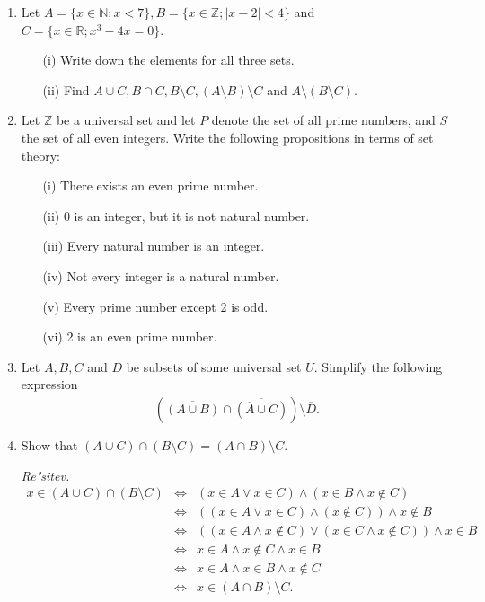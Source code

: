 \documentclass[11pt,paper=b5,footinclude,headinclude]{scrbook} %
\theoremstyle{remark}
\theoremstyle{definition} %
\theoremstyle{theorem} %
\begin{document}
\begin{enumerate}
\item Let $A = \{ x \in \mathbb{N}; x < 7\}, B = \{x \in  \mathbb{Z}; |x - 2| < 4\}$ and $C = \{x \in\mathbb{R}; x^3 -  4x = 0\}$.
\begin{enumerate}
\item[(i)]  Write down the elements for all three sets.
\item[(ii)] Find $A \cup C, B \cap C, B \setminus C, (A \setminus B) \setminus C$ and $A \setminus (B \setminus C)$.
\end{enumerate}

\item Let  $\mathbb{Z}$ be a universal set and let  $P$ denote the set of all prime numbers, and $S$ the set of all even integers. Write the following propositions in terms of set theory:
\begin{itemize}
\item[(i)] There exists an even prime number. 
\item[(ii)] $0$ is an integer, but it is not natural number. 
\item[(iii)] Every natural number is an integer. 
\item[(iv)] Not every integer is a natural number. 
\item[(v)] Every prime number except 2 is odd. 
\item[(vi)] 2 is an even prime number. \quad [$2\in S\cap P$]
\end{itemize}

\item Let  $A, B, C$ and $D$  be subsets of some universal set  $U$. Simplify the following expression
$$\overline{(\overline{(A\cup B)} \cap \overline{(\overline{A} \cup C)})}\setminus \overline{D}.$$

\item Show that $(A\cup C)\cap (B\setminus C) = (A\cap B)\setminus C$.

\emph{ Re"sitev.} 
\begin{eqnarray*}
x\in (A\cup C)\cap (B\setminus C) &\Leftrightarrow & (x\in A \vee x\in C) \wedge (x\in B \wedge x\notin C)\\
 &\Leftrightarrow & ((x\in A \vee x\in C) \wedge (x\notin C))\wedge x\notin B\\
&\Leftrightarrow & ((x\in A \wedge x\notin C) \vee (x\in C \wedge x\notin C)) \wedge
 x\in B\\
&\Leftrightarrow & x\in A \wedge x\notin C  \wedge x\in B\\
&\Leftrightarrow & x\in A \wedge x\in B  \wedge x\notin C \\
&\Leftrightarrow & x \in (A\cap B)\setminus C. 
\end{eqnarray*}


\end{enumerate}
\end{document}
